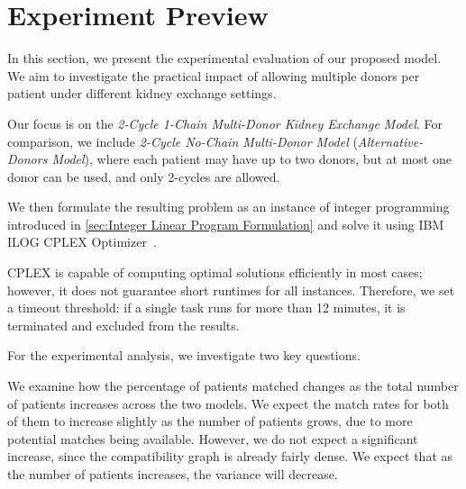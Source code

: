 \section{Experiment Preview}

In this section, we present the experimental evaluation of our proposed model. We aim to investigate the practical impact of allowing multiple donors per patient under different kidney exchange settings.

Our focus is on the \textit{2-Cycle 1-Chain Multi-Donor Kidney Exchange Model}. For comparison, we include \textit{2-Cycle No-Chain Multi-Donor Model} (\textit{Alternative-Donors Model}), where each patient may have up to two donors, but at most one donor can be used, and only 2-cycles are allowed.

We then formulate the resulting problem as an instance of integer programming introduced in \autoref{sec:Integer Linear Program Formulation} and solve it using IBM ILOG CPLEX Optimizer~\cite{cplex}.

CPLEX is capable of computing optimal solutions efficiently in most cases; however, it does not guarantee short runtimes for all instances. Therefore, we set a timeout threshold: if a single task runs for more than 12 minutes, it is terminated and excluded from the results.


For the experimental analysis, we investigate two key questions.
\begin{experiment}
    \label{exp:percentage_vs_number_of_patients}
    \textup{We examine how the percentage of patients matched changes as the total number of patients increases across the two models. We expect the match rates for both of them to increase slightly as the number of patients grows, due to more potential matches being available. However, we do not expect a significant increase, since the compatibility graph is already fairly dense. We expect that as the number of patients increases, the variance will decrease.}
\end{experiment}




